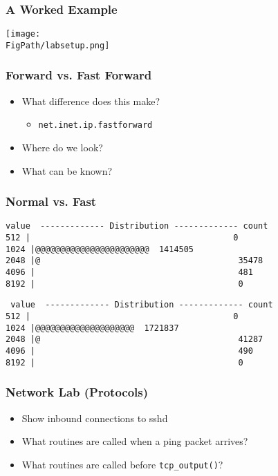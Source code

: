 \documentclass[pdftex]{beamer}
\begin{document}
\begin{frame}
  \frametitle{A Worked Example}
      \texttt{[image: \\FigPath/labsetup.png]}
\end{frame}

\begin{frame}[fragile]
  \frametitle{Forward vs. Fast Forward}
  \begin{itemize}
  \item What difference does this make?
    \begin{itemize}
    \item \verb+net.inet.ip.fastforward+
    \end{itemize}
  \item Where do we look?
  \item What can be known?
  \end{itemize}
\end{frame}

\begin{frame}[fragile]
  \frametitle{Normal vs. Fast}
\begin{verbatim}
value  ------------- Distribution ------------- count    
512 |                                         0        
1024 |@@@@@@@@@@@@@@@@@@@@@@@  1414505  
2048 |@                                        35478    
4096 |                                         481      
8192 |                                         0        
\end{verbatim}

\begin{verbatim}
 value  ------------- Distribution ------------- count    
512 |                                         0        
1024 |@@@@@@@@@@@@@@@@@@@@  1721837  
2048 |@                                        41287    
4096 |                                         490      
8192 |                                         0        
\end{verbatim}
\end{frame}


\begin{frame}[fragile]
  \frametitle{Network Lab (Protocols)}
  \begin{itemize}
  \item Show inbound connections to sshd
  \item What routines are called when a ping packet arrives?
  \item What routines are called before \verb+tcp_output()+?
  \end{itemize}
\end{frame}
\end{document}
